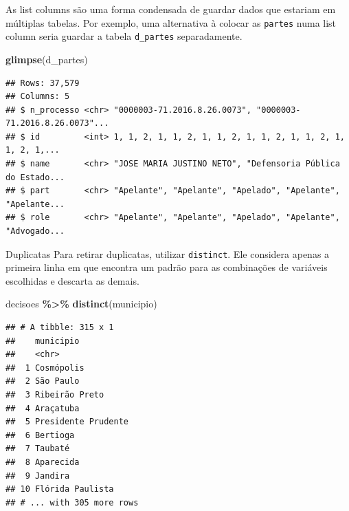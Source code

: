 \documentclass[
  10pt,
  ignorenonframetext,
]{beamer}
\newenvironment{Shaded}{\begin{snugshade}}{\end{snugshade}}
\newcommand{\KeywordTok}[1]{\textcolor[rgb]{0.13,0.29,0.53}{\textbf{#1}}}
\newcommand{\NormalTok}[1]{#1}
\newcommand{\OperatorTok}[1]{\textcolor[rgb]{0.81,0.36,0.00}{\textbf{#1}}}
\newcommand{\StringTok}[1]{\textcolor[rgb]{0.31,0.60,0.02}{#1}}
\begin{document}
\begin{frame}[fragile]{}
\protect\hypertarget{section-4}{}
As list columns são uma forma condensada de guardar dados que estariam
em múltiplas tabelas. Por exemplo, uma alternativa à colocar as
\texttt{partes} numa list column seria guardar a tabela
\texttt{d\_partes} separadamente.

\begin{Shaded}
\begin{Highlighting}[]
\KeywordTok{glimpse}\NormalTok{(d\_partes)}
\end{Highlighting}
\end{Shaded}

\begin{verbatim}
## Rows: 37,579
## Columns: 5
## $ n_processo <chr> "0000003-71.2016.8.26.0073", "0000003-71.2016.8.26.0073"...
## $ id         <int> 1, 1, 2, 1, 1, 2, 1, 1, 2, 1, 1, 2, 1, 1, 2, 1, 1, 2, 1,...
## $ name       <chr> "JOSE MARIA JUSTINO NETO", "Defensoria Pública do Estado...
## $ part       <chr> "Apelante", "Apelante", "Apelado", "Apelante", "Apelante...
## $ role       <chr> "Apelante", "Apelante", "Apelado", "Apelante", "Advogado...
\end{verbatim}
\end{frame}

\begin{frame}[fragile]{Duplicatas}
\protect\hypertarget{duplicatas}{}
Para retirar duplicatas, utilizar \texttt{distinct}. Ele considera
apenas a primeira linha em que encontra um padrão para as combinações de
variáveis escolhidas e descarta as demais.

\begin{Shaded}
\begin{Highlighting}[]
\NormalTok{decisoes }\OperatorTok{\%\textgreater{}\%}\StringTok{ }
\StringTok{  }\KeywordTok{distinct}\NormalTok{(municipio)}
\end{Highlighting}
\end{Shaded}

\begin{verbatim}
## # A tibble: 315 x 1
##    municipio          
##    <chr>              
##  1 Cosmópolis         
##  2 São Paulo          
##  3 Ribeirão Preto     
##  4 Araçatuba          
##  5 Presidente Prudente
##  6 Bertioga           
##  7 Taubaté            
##  8 Aparecida          
##  9 Jandira            
## 10 Flórida Paulista   
## # ... with 305 more rows
\end{verbatim}
\end{frame}
\end{document}
